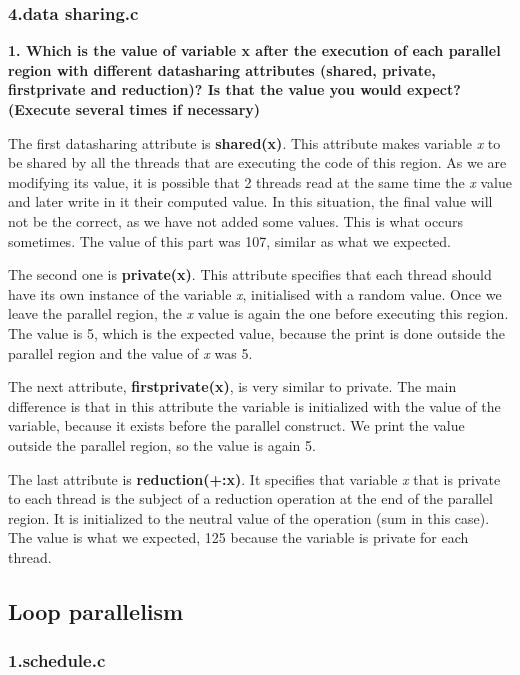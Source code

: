 \documentclass[12pt, a4paper]{article}
\begin{document}
\subsubsection{4.data sharing.c}

\textbf{1. Which is the value of variable x after the execution of each parallel region with different datasharing attributes (shared, private, firstprivate and reduction)? Is that the value you would expect? (Execute several times if necessary)}

The first datasharing attribute is \textbf{shared(x)}. This attribute makes variable \textit{x} to be shared by all the threads that are executing the code of this region. As we are modifying its value, it is possible that 2 threads read at the same time the \textit{x} value and later write in it their computed value. In this situation, the final value will not be the correct, as we have not added some values. This is what occurs sometimes. The value of this part was 107, similar as what we expected.

The second one is \textbf{private(x)}. This attribute specifies that each thread should have its own instance of the variable \textit{x}, initialised with a random value. Once we leave the parallel region, the \textit{x} value is again the one before executing this region. The value is 5, which is the expected value, because the print is done outside the parallel region and the value of \textit{x} was 5.

The next attribute, \textbf{firstprivate(x)}, is very similar to private. The main difference is that in this attribute the variable is initialized with the value of the variable, because it exists before the parallel construct. We print the value outside the parallel region, so the value is again 5.

The last attribute is \textbf{reduction(+:x)}. It specifies that variable \textit{x} that is private to each thread is the subject of a reduction operation at the end of the parallel region. It is initialized to the neutral value of the operation (sum in this case). The value is what we expected, 125 because the variable is private for each thread.

\subsection{Loop parallelism}

\subsubsection{1.schedule.c}
\end{document}
